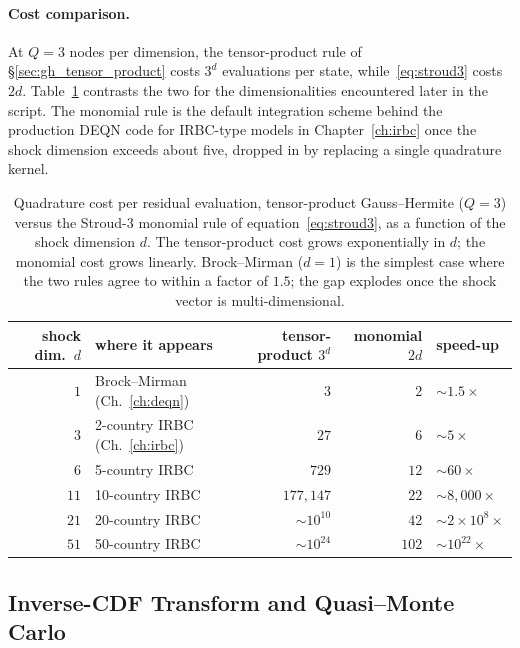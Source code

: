 \documentclass[11pt,a4paper]{report}
\begin{document}
\paragraph{Cost comparison.}  At $Q=3$ nodes per dimension, the tensor-product rule of \S\ref{sec:gh_tensor_product} costs $3^{d}$ evaluations per state, while~\eqref{eq:stroud3} costs $2d$.  Table~\ref{tab:quadrature_costs} contrasts the two for the dimensionalities encountered later in the script.  The monomial rule is the default integration scheme behind the production DEQN code for IRBC-type models in Chapter~\ref{ch:irbc} once the shock dimension exceeds about five, dropped in by replacing a single quadrature kernel.

\begin{table}[ht]
\centering
\small
\begin{tabular}{r l r r l@{}}
\toprule
shock dim.\ $d$ & where it appears & tensor-product $3^{d}$ & monomial $2d$ & speed-up \\
\midrule
$1$  & Brock--Mirman (Ch.~\ref{ch:deqn})        & $3$              & $2$   & $\sim 1.5\times$\\
$3$  & 2-country IRBC (Ch.~\ref{ch:irbc})       & $27$             & $6$   & $\sim 5\times$\\
$6$  & 5-country IRBC                           & $729$            & $12$  & $\sim 60\times$\\
$11$ & 10-country IRBC                          & $177{,}147$      & $22$  & $\sim 8{,}000\times$\\
$21$ & 20-country IRBC                          & $\sim 10^{10}$   & $42$  & $\sim 2 \times 10^8\times$\\
$51$ & 50-country IRBC                          & $\sim 10^{24}$   & $102$ & $\sim 10^{22}\times$\\
\bottomrule
\end{tabular}
\caption{Quadrature cost per residual evaluation, tensor-product Gauss--Hermite ($Q=3$) versus the Stroud-3 monomial rule of equation~\eqref{eq:stroud3}, as a function of the shock dimension $d$.  The tensor-product cost grows exponentially in $d$; the monomial cost grows linearly.  Brock--Mirman ($d=1$) is the simplest case where the two rules agree to within a factor of $1.5$; the gap explodes once the shock vector is multi-dimensional.}
\label{tab:quadrature_costs}
\end{table}

\subsection{Inverse-CDF Transform and Quasi--Monte Carlo}
\label{sec:qmc_cdf}
\end{document}
